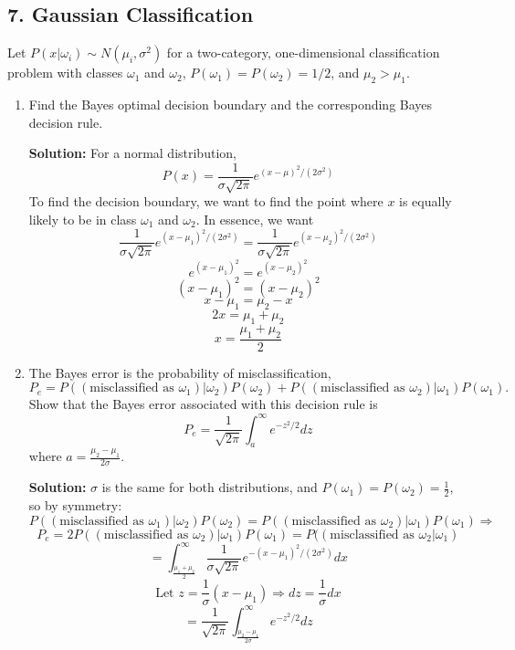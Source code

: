 \documentclass{article}
\newcommand{\solution}{\textbf{Solution: }}
\begin{document}
\newpage
\subsection*{7. Gaussian Classification}
Let $P(x | \omega_i) \sim N(\mu_i, \sigma^2)$ for a two-category, one-dimensional classification problem with classes $\omega_1$ and $\omega_2$, $P(\omega_1) = P(\omega_2) = 1/2$, and $\mu_2 > \mu_1$. 
\begin{enumerate}[label=(\alph*)]
    \item Find the Bayes optimal decision boundary and the corresponding Bayes decision rule. 
    \begin{mdframed}
    \solution For a normal distribution,
    $$P(x)=\frac{1}{\sigma\sqrt{2\pi}}e^{(x-\mu)^2/(2\sigma^2)}$$
    To find the decision boundary, we want to find the point where $x$ is equally likely to be in class $\omega_1$ and $\omega_2$. In essence, we want
    $$\frac{1}{\sigma\sqrt{2\pi}}e^{(x-\mu_1)^2/(2\sigma^2)}=\frac{1}{\sigma\sqrt{2\pi}}e^{(x-\mu_2)^2/(2\sigma^2)}$$
    $$e^{(x-\mu_1)^2}=e^{(x-\mu_2)^2}$$
    $$(x-\mu_1)^2=(x-\mu_2)^2$$
    $$x-\mu_1=\mu_2-x$$
    $$2x=\mu_1+\mu_2$$
    $$x=\frac{\mu_1+\mu_2}{2}$$
    \end{mdframed}
    
    \item The Bayes error is the probability of misclassification, $$ P_e = P((\text{misclassified as }\omega_1) | \omega_2)P(\omega_2) + P((\text{misclassified as }\omega_2)|\omega_1)P(\omega_1).$$
    Show that the Bayes error associated with this decision rule is
    $$ P_e = \frac{1}{\sqrt{2\pi}} \int_a^{\infty} e^{-z^2/2} dz$$ where $a = \frac{\mu_2 - \mu_1}{2\sigma}$. 
    \begin{mdframed}
    \solution $\sigma$ is the same for both distributions, and $P(\omega_1)=P(\omega_2)=\frac{1}{2}$, so by symmetry:
    $$P((\text{misclassified as }\omega_1)|\omega_2)P(\omega_2)=P((\text{misclassified as }\omega_2)|\omega_1)P(\omega_1) \Rightarrow$$
    $$P_e=2P((\text{misclassified as }\omega_2)|\omega_1)P(\omega_1)=P((\text{misclassified as }\omega_2|\omega_1)$$
    $$=\int_\frac{\mu_1+\mu_2}{2}^{\infty}\frac{1}{\sigma\sqrt{2\pi}}e^{-(x-\mu_1)^2/(2\sigma^2)}dx$$
    $$\text{Let }z=\frac{1}{\sigma}(x-\mu_1) \Rightarrow dz=\frac{1}{\sigma}dx$$
    $$=\frac{1}{\sqrt{2\pi}}\int_{\frac{\mu_2-\mu_1}{2\sigma}}^{\infty}e^{-z^2/2}dz$$
    \end{mdframed}
\end{enumerate}

\newpage
\end{document}
